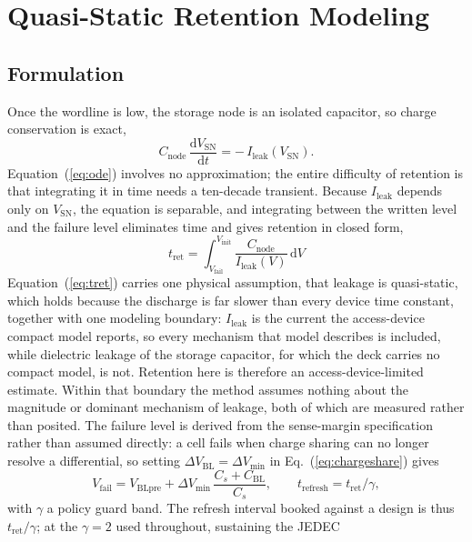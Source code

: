 \documentclass[11pt,a4paper]{article}
\newcommand{\Vsn}{V_{\mathrm{SN}}}
\newcommand{\Vfail}{V_{\mathrm{fail}}}
\newcommand{\Vblpre}{V_{\mathrm{BLpre}}}
\newcommand{\Ileak}{I_{\mathrm{leak}}}
\newcommand{\Cnode}{C_{\mathrm{node}}}
\newcommand{\Cs}{C_{s}}
\newcommand{\Cbl}{C_{\mathrm{BL}}}
\newcommand{\tret}{t_{\mathrm{ret}}}
\newcommand{\dVbl}{\Delta V_{\mathrm{BL}}}
\newcommand{\dVmin}{\Delta V_{\min}}
\begin{document}
\section{Quasi-Static Retention Modeling}
\label{sec:retention}

\subsection{Formulation}

Once the wordline is low, the storage node is an isolated capacitor, so charge
conservation is exact,
\begin{equation}
\Cnode\,\frac{\mathrm{d}\Vsn}{\mathrm{d}t} = -\,\Ileak(\Vsn).
\label{eq:ode}
\end{equation}
Equation~(\ref{eq:ode}) involves no approximation; the entire difficulty of
retention is that integrating it in time needs a ten-decade transient. Because
$\Ileak$ depends only on $\Vsn$, the equation is separable, and integrating
between the written level and the failure level eliminates time and gives
retention in closed form,
\begin{equation}
\boxed{\;
\tret = \int_{\Vfail}^{V_{\mathrm{init}}}
\frac{\Cnode}{\Ileak(V)}\,\mathrm{d}V \;}
\label{eq:tret}
\end{equation}
Equation~(\ref{eq:tret}) carries one physical assumption, that leakage is
quasi-static, which holds because the discharge is far slower than every device
time constant, together with one modeling boundary: $\Ileak$ is the current the
access-device compact model reports, so every mechanism that model describes is
included, while dielectric leakage of the storage capacitor, for which the deck
carries no compact model, is not. Retention here is therefore an
access-device-limited estimate. Within that boundary the method assumes nothing
about the magnitude or dominant mechanism of leakage, both of which are measured
rather than posited. The failure level is derived from the sense-margin
specification rather than assumed directly: a cell fails when charge sharing can no
longer resolve a differential, so setting $\dVbl=\dVmin$ in
Eq.~(\ref{eq:chargeshare}) gives
\begin{equation}
\Vfail = \Vblpre + \dVmin\,\frac{\Cs+\Cbl}{\Cs},
\qquad
t_{\mathrm{refresh}} = \tret / \gamma ,
\label{eq:vfail}
\end{equation}
with $\gamma$ a policy guard band. The refresh interval booked against a design is
thus $\tret/\gamma$; at the $\gamma=2$ used throughout, sustaining the JEDEC
\end{document}
